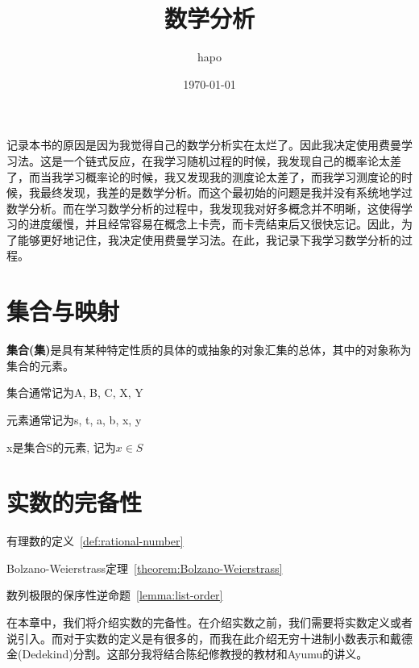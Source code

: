 \documentclass[lang=cn]{elegantbook}
\title{数学分析}
\author{hapo}
\date{\today}
\begin{document}
\maketitle
\frontmatter

\tableofcontents

\mainmatter
记录本书的原因是因为我觉得自己的数学分析实在太烂了。因此我决定使用费曼学习法。这是一个链式反应，在我学习随机过程的时候，我发现自己的概率论太差了，而当我学习概率论的时候，我又发现我的测度论太差了，而我学习测度论的时候，我最终发现，我差的是数学分析。而这个最初始的问题是我并没有系统地学过数学分析。而在学习数学分析的过程中，我发现我对好多概念并不明晰，这使得学习的进度缓慢，并且经常容易在概念上卡壳，而卡壳结束后又很快忘记。因此，为了能够更好地记住，我决定使用费曼学习法。在此，我记录下我学习数学分析的过程。
\chapter{集合与映射}
\begin{definition}[集合]
{\bf 集合(集)}是具有某种特定性质的具体的或抽象的对象汇集的总体，其中的对象称为集合的元素。
\end{definition}
集合通常记为A, B, C, X, Y

元素通常记为s, t, a, b, x, y

x是集合S的元素, 记为$x\in S$
\chapter{实数的完备性}
\begin{introduction}
  \item 有理数的定义~\ref{def:rational-number}
  \item Bolzano-Weierstrass定理~\ref{theorem:Bolzano-Weierstrass}
  \item 数列极限的保序性逆命题~\ref{lemma:list-order}
\end{introduction}
在本章中，我们将介绍实数的完备性。在介绍实数之前，我们需要将实数定义或者说引入。而对于实数的定义是有很多的，而我在此介绍无穷十进制小数表示和戴德金(Dedekind)分割。这部分我将结合陈纪修教授的教材和Ayumu的讲义。
\end{document}
